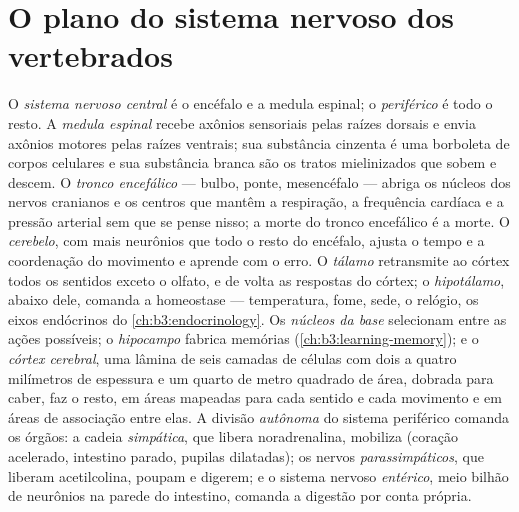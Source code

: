 \section{O plano do sistema nervoso dos vertebrados}

\begin{definition}\label{def:b3:nervous-systems:plan}
O \emph{sistema nervoso central} é o encéfalo e a medula espinal; o
\emph{periférico} é todo o resto. A \emph{medula espinal} recebe axônios
sensoriais pelas raízes dorsais e envia axônios motores pelas raízes
ventrais; sua substância cinzenta é uma borboleta de corpos celulares e
sua substância branca são os tratos mielinizados que sobem e descem. O
\emph{tronco encefálico} --- bulbo, ponte, mesencéfalo --- abriga os
núcleos dos nervos cranianos e os centros que mantêm a respiração, a
frequência cardíaca e a pressão arterial sem que se pense nisso; a morte
do tronco encefálico é a morte. O \emph{cerebelo}, com mais neurônios
que todo o resto do encéfalo, ajusta o tempo e a coordenação do
movimento e aprende com o erro. O \emph{tálamo} retransmite ao córtex
todos os sentidos exceto o olfato, e de volta as respostas do córtex; o
\emph{hipotálamo}, abaixo dele, comanda a homeostase --- temperatura,
fome, sede, o relógio, os eixos endócrinos do
\cref{ch:b3:endocrinology}. Os \emph{núcleos da base} selecionam entre
as ações possíveis; o \emph{hipocampo} fabrica memórias
(\cref{ch:b3:learning-memory}); e o \emph{córtex cerebral}, uma lâmina
de seis camadas de células com dois a quatro milímetros de espessura e
um quarto de metro quadrado de área, dobrada para caber, faz o resto, em
áreas mapeadas para cada sentido e cada movimento e em áreas de
associação entre elas. A divisão \emph{autônoma} do sistema periférico
comanda os órgãos: a cadeia \emph{simpática}, que libera noradrenalina,
mobiliza (coração acelerado, intestino parado, pupilas dilatadas); os
nervos \emph{parassimpáticos}, que liberam acetilcolina, poupam e
digerem; e o sistema nervoso \emph{entérico}, meio bilhão de neurônios
na parede do intestino, comanda a digestão por conta própria.
\end{definition}

